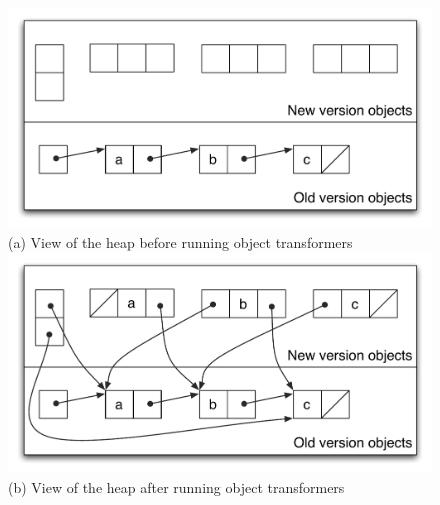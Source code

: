 \begin{figure}[t]
\begin{center}
\includegraphics[scale=0.48]{100-images/singly-doubly/old-world-singly-doubly-before-transform}
\\
(a) View of the heap before running object transformers \\[1ex]
\includegraphics[scale=0.48]{100-images/singly-doubly/old-world-singly-doubly-transformed}
\\
(b) View of the heap after running object transformers \\
\VspaceFixForHangcaption
\end{center}
\end{figure}
